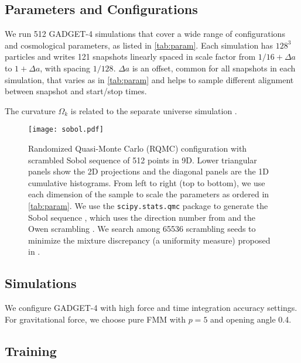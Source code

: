 \documentclass[usenatbib]{mnras}
\begin{document}
\subsection{Parameters and Configurations}

We run 512 GADGET-4 simulations that cover a wide range of
configurations and cosmological parameters, as listed in
\autoref{tab:param}.
Each simulation has $128^3$ particles and writes 121 snapshots linearly
spaced in scale factor from $1/16 + \Delta a$ to $1 + \Delta a$, with
spacing $1/128$.
$\Delta a$ is an offset, common for all snapshots in each simulation,
that varies as in \autoref{tab:param} and helps to sample different
alignment between snapshot and start/stop times.

The curvature $\Omega_k$ is related to the separate universe simulation
\citep{LiEtAl2014}.


\begin{figure*}
  \centering
  \texttt{[image: sobol.pdf]}
  \caption{Randomized Quasi-Monte Carlo (RQMC) configuration with
    scrambled Sobol sequence of 512 points in 9D.
    Lower triangular panels show the 2D projections and the diagonal
    panels are the 1D cumulative histograms.
    From left to right (top to bottom), we use each dimension of the
    sample to scale the parameters as ordered in \autoref{tab:param}.
    We use the \texttt{scipy.stats.qmc} package \citep{SciPy} to
    generate the Sobol sequence \citep{Sobol1967}, which uses the
    direction number from \citet{JoeKuo2008} and the Owen scrambling
    \citep{Owen1998}.
    We search among 65536 scrambling seeds to minimize the mixture
    discrepancy (a uniformity measure) proposed in \citet{Zhou2013MD}.
  }
  \label{fig:sobol}
\end{figure*}


\subsection{Simulations}

\citet{GADGET-4}

We configure GADGET-4 with high force and time integration accuracy
settings.
For gravitational force, we choose pure FMM with $p=5$ and opening angle
0.4.


\subsection{Training}
\end{document}
